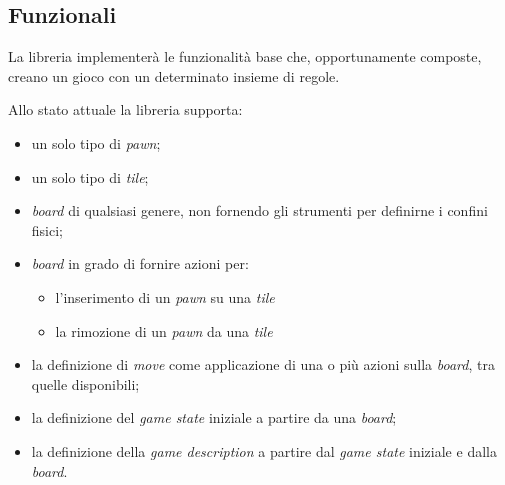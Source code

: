 
\subsection{Funzionali}

La libreria implementerà le funzionalità base che, opportunamente composte, creano un gioco con un determinato insieme di regole.

Allo stato attuale la libreria supporta:

\begin{itemize}
    \item un solo tipo di \textit{pawn};
    \item un solo tipo di \textit{tile};
    \item \textit{board} di qualsiasi genere, non fornendo gli strumenti per definirne i confini fisici;
    \item \textit{board} in grado di fornire azioni per:
    \begin{itemize}
        \item l'inserimento di un \textit{pawn} su una \textit{tile}
        \item la rimozione di un \textit{pawn} da una \textit{tile}
    \end{itemize}
    \item la definizione di \textit{move} come applicazione di una o più azioni sulla \textit{board}, tra quelle disponibili;
    \item la definizione del \textit{game state} iniziale a partire da una \textit{board};
    \item la definizione della \textit{game description} a partire dal \textit{game state} iniziale e dalla \textit{board}.
\end{itemize}

